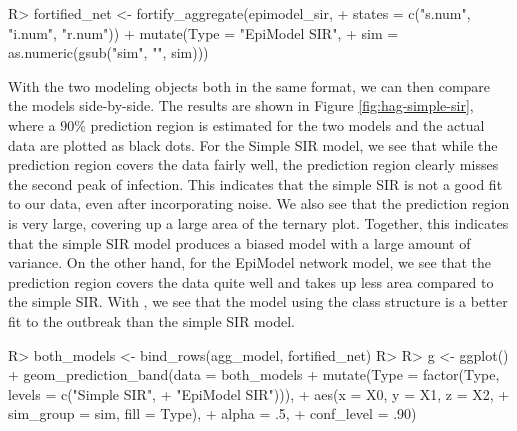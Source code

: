 \documentclass[
  shortnames]{jss}
\begin{document}
\begin{CodeChunk}
\begin{CodeInput}
R> fortified_net <- fortify_aggregate(epimodel_sir, 
+                                    states = c("s.num", "i.num", "r.num")) %
+   mutate(Type = "EpiModel SIR",
+          sim = as.numeric(gsub("sim", "", sim)))
\end{CodeInput}
\end{CodeChunk}

With the two modeling objects both in the same format, we can then
compare the models side-by-side. The results are shown in Figure
\ref{fig:hag-simple-sir}, where a 90\% prediction region is estimated
for the two models and the actual data are plotted as black dots. For
the Simple SIR model, we see that while the prediction region covers the
data fairly well, the prediction region clearly misses the second peak
of infection. This indicates that the simple SIR is not a good fit to
our data, even after incorporating noise. We also see that the
prediction region is very large, covering up a large area of the ternary
plot. Together, this indicates that the simple SIR model produces a
biased model with a large amount of variance. On the other hand, for the
EpiModel network model, we see that the prediction region covers the
data quite well and takes up less area compared to the simple SIR. With
, we see that the model using the class structure is a
better fit to the outbreak than the simple SIR model.

\begin{CodeChunk}
\begin{CodeInput}
R> both_models <- bind_rows(agg_model, fortified_net)
R> 
R> g <- ggplot() + geom_prediction_band(data = both_models %
+                   mutate(Type = factor(Type, levels = c("Simple SIR", 
+                                                         "EpiModel SIR"))),
+          aes(x = X0, y = X1, z = X2,
+               sim_group = sim, fill = Type),
+          alpha = .5,
+          conf_level = .90) 
\end{CodeInput}
\end{CodeChunk}
\end{document}
